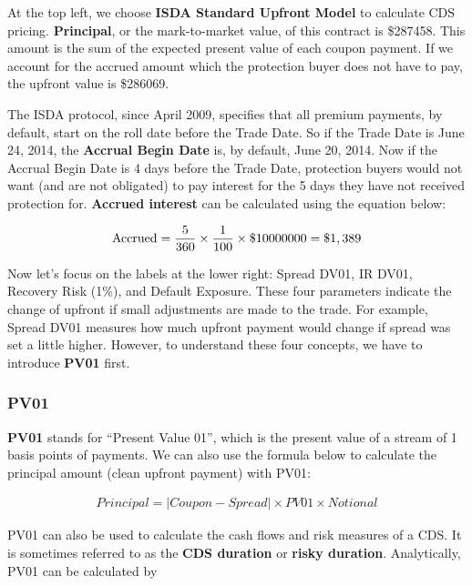 \documentclass{jss}
\begin{document}
At the top left, we choose \textbf{ISDA Standard Upfront Model} to calculate CDS pricing. \textbf{Principal}, or the mark-to-market value, of this contract is \$287458. This amount is the sum of the expected present value of each coupon payment. If we account for the accrued amount which the protection buyer does not have to pay, the upfront value is \$286069. 

The ISDA protocol, since April 2009, specifies that all premium payments, by default, start on the roll date before the Trade Date. So if the Trade Date is June 24, 2014, the \textbf{Accrual Begin Date} is, by default, June 20, 2014. Now if the Accrual Begin Date is 4 days before the Trade Date, protection buyers would not want (and are not obligated) to pay interest for the 5 days they have not received protection for. \textbf{Accrued interest} can be calculated using the equation below:

\begin{equation}
 \begin{aligned}
  {\rm Accrued = \frac{5}{360} \times \frac{1}{100} \times \$10000000 = \$1,389}
    \end{aligned}
\end{equation}

Now let's focus on the labels at the lower right: Spread DV01, IR DV01, Recovery Risk (1\%), and Default Exposure. These four parameters indicate the change of upfront if small adjustments are made to the trade. For example, Spread DV01 measures how much upfront payment would change if spread was set a little higher. However, to understand these four concepts, we have to introduce \textbf{PV01} first.

\subsubsection{PV01}
\label{sec:PV01}

\textbf{PV01} stands for ``Present Value 01'', which is the present value of a stream of 1 basis points of payments. We can also use the formula below to calculate the principal amount (clean upfront payment) with PV01:

\begin{equation}
 \begin{aligned}
  Principal = |Coupon - Spread| \times PV01 \times Notional
    \end{aligned}
\end{equation}

PV01 can also be used to calculate the cash flows and risk measures of a CDS. It is sometimes referred to as the \textbf{CDS duration} or \textbf{risky duration}. Analytically, PV01 can be calculated by
\end{document}
